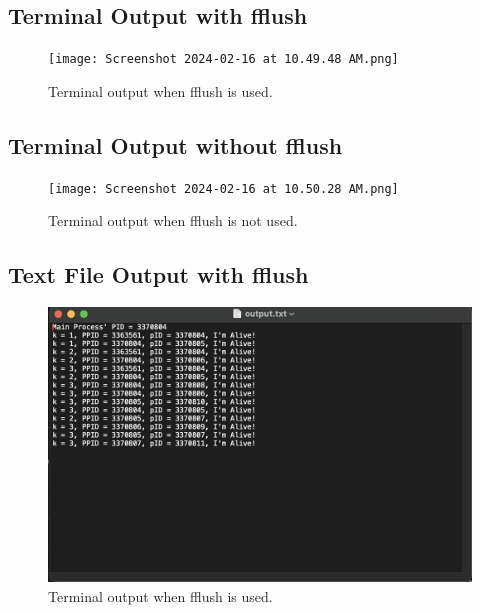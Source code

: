 \documentclass[12pt]{article}
\begin{document}
  \subsection{Terminal Output with fflush}
    \begin{figure}[h]
    \centering
    \texttt{[image: Screenshot 2024-02-16 at 10.49.48 AM.png]}
    \caption{Terminal output when fflush is used.}
    \end{figure}

\subsection{Terminal Output without fflush}
\begin{figure}[h]
\centering
\texttt{[image: Screenshot 2024-02-16 at 10.50.28 AM.png]}
\caption{Terminal output when fflush is not used.}
\end{figure}

\subsection{Text File Output with fflush}
\begin{figure}[h]
\centering
\includegraphics[width=\textwidth]{output_with_fflush.png}
\caption{Terminal output when fflush is used.}
\end{figure}

\newpage
\end{document}
